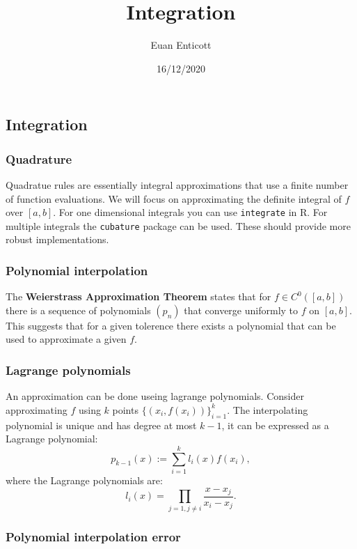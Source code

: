 \documentclass[
]{article}
\title{Integration}
\author{Euan Enticott}
\date{16/12/2020}
\begin{document}
\maketitle

\hypertarget{integration}{%
\subsection{Integration}\label{integration}}

\hypertarget{quadrature}{%
\subsubsection{Quadrature}\label{quadrature}}

Quadratue rules are essentially integral approximations that use a
finite number of function evaluations. We will focus on approximating
the definite integral of \(f\) over \([a,b]\). For one dimensional
integrals you can use \texttt{integrate} in R. For multiple integrals
the \texttt{cubature} package can be used. These should provide more
robust implementations.

\hypertarget{polynomial-interpolation}{%
\subsubsection{Polynomial
interpolation}\label{polynomial-interpolation}}

The \textbf{Weierstrass Approximation Theorem} states that for
\(f \in C^{0}([a,b])\) there is a sequence of polynomials \((p_{n})\)
that converge uniformly to \(f\) on \([a,b]\). This suggests that for a
given tolerence there exists a polynomial that can be used to
approximate a given \(f\).

\hypertarget{lagrange-polynomials}{%
\subsubsection{Lagrange polynomials}\label{lagrange-polynomials}}

An approximation can be done useing lagrange polynomials. Consider
approximating \(f\) using \(k\) points
\(\{(x_{i}, f(x_{i}))\}_{i=1}^{k}\). The interpolating polynomial is
unique and has degree at most \(k-1\), it can be expressed as a Lagrange
polynomial: \[p_{k-1}(x) := \sum_{i=1}^{k}l_{i}(x)f(x_{i}),\] where the
Lagrange polynomials are:
\[l_{i}(x) = \prod_{j=1,j \neq i}\frac{x - x_{j}}{x_{i} - x_{j}} . \]

\hypertarget{polynomial-interpolation-error}{%
\subsubsection{Polynomial interpolation
error}\label{polynomial-interpolation-error}}
\end{document}
